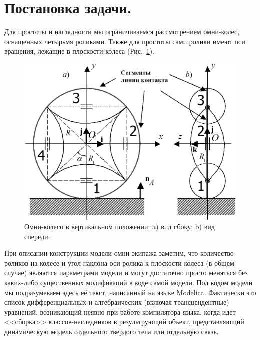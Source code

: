 \documentclass[12pt,a4paper]{article}
\begin{document}
\section{Постановка задачи.\ }
\label{sec2}
Для простоты и наглядности мы ограничиваемся рассмотрением омни-колес, 
оснащенных четырьмя роликами. Также для простоты сами ролики имеют оси 
вращения, лежащие в плоскости колеса (Рис.~\ref{OmniWheel}).
\begin{figure}[htb]
\centering\includegraphics[width=13cm]{OmniWheel.eps}
\caption{Омни-колесо в вертикальном положении: a) вид сбоку; b) вид спереди.}
\label{OmniWheel}
\end{figure}

При описании конструкции модели омни-экипажа заметим, что количество роликов на
колесе и угол наклона оси ролика к плоскости колеса (в общем случае) являются 
параметрами модели и могут достаточно просто меняться без каких-либо 
существенных модификаций в коде самой модели. Под кодом модели мы подразумеваем
здесь её текст, написанный на языке Modelica. Фактически это список 
дифференциальных и алгебраических (включая трансцендентные) уравнений, 
возникающий неявно при работе компилятора языка, когда идет <<сборка>> 
классов-наследников в результрующий объект, представляющий динамическую модель
отдельного твердого тела или отдельную связь.
\end{document}
